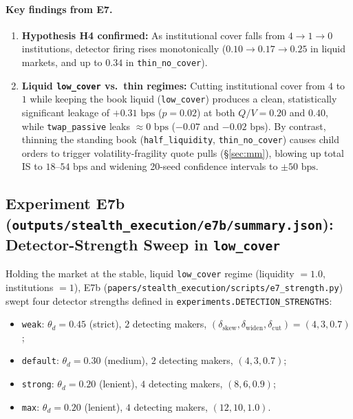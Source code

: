 \documentclass[11pt,a4paper]{article}
\newcommand{\code}[1]{\texttt{#1}}
\begin{document}
\paragraph{Key findings from E7.}
\begin{enumerate}[nosep]
\item \textbf{Hypothesis H4 confirmed:} As institutional cover falls from $4 \to 1 \to 0$ institutions,
  detector firing rises monotonically ($0.10 \to 0.17 \to 0.25$ in liquid markets, and up to $0.34$ in
  \code{thin\_no\_cover}).
\item \textbf{Liquid \code{low\_cover} vs.\ thin regimes:} Cutting institutional cover from $4$ to $1$
  while keeping the book liquid (\code{low\_cover}) produces a clean, statistically significant leakage
  of $+0.31\text{ bps}$ ($p = 0.02$) at both $Q/V = 0.20$ and $0.40$, while \code{twap\_passive} leaks
  $\approx 0\text{ bps}$ ($-0.07$ and $-0.02\text{ bps}$). By contrast, thinning the standing book
  (\code{half\_liquidity}, \code{thin\_no\_cover}) causes child orders to trigger volatility-fragility
  quote pulls (\S\ref{sec:mm}), blowing up total IS to $18$--$54\text{ bps}$ and widening 20-seed
  confidence intervals to $\pm 50\text{ bps}$.
\end{enumerate}

\subsection{Experiment E7b (\code{outputs/stealth\_execution/e7b/summary.json}): Detector-Strength Sweep in \code{low\_cover}}

Holding the market at the stable, liquid \code{low\_cover} regime (liquidity $= 1.0$, institutions $= 1$),
E7b (\code{papers/stealth\_execution/scripts/e7\_strength.py}) swept four detector strengths defined in
\code{experiments.DETECTION\_STRENGTHS}:
\begin{itemize}[nosep]
\item \code{weak}: $\theta_d = 0.45$ (strict), $2$ detecting makers, $(\delta_{\text{skew}}, \delta_{\text{widen}}, \delta_{\text{cut}}) = (4, 3, 0.7)$;
\item \code{default}: $\theta_d = 0.30$ (medium), $2$ detecting makers, $(4, 3, 0.7)$;
\item \code{strong}: $\theta_d = 0.20$ (lenient), $4$ detecting makers, $(8, 6, 0.9)$;
\item \code{max}: $\theta_d = 0.20$ (lenient), $4$ detecting makers, $(12, 10, 1.0)$.
\end{itemize}
\end{document}
